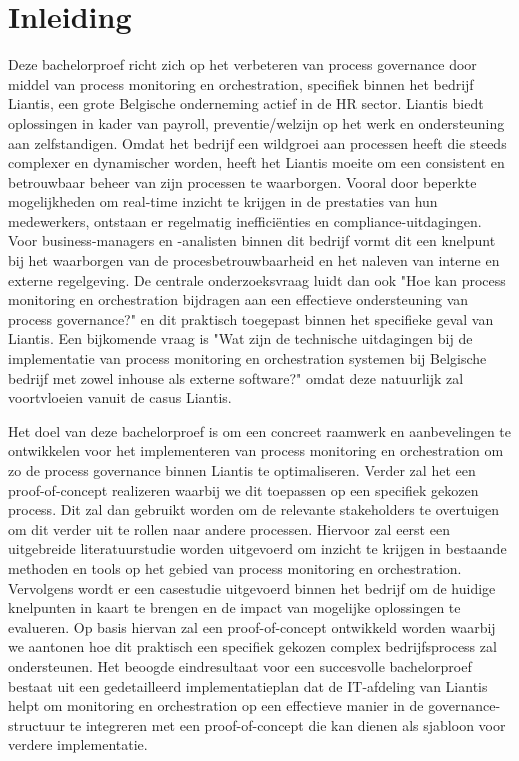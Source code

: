 
\section{Inleiding}%
\label{sec:inleiding}

Deze bachelorproef richt zich op het verbeteren van process governance door middel van process monitoring en orchestration, specifiek binnen het bedrijf Liantis, een grote Belgische onderneming actief in de HR sector. Liantis biedt oplossingen in kader van payroll, preventie/welzijn op het werk en ondersteuning aan zelfstandigen. Omdat het bedrijf een wildgroei aan processen heeft die steeds complexer en dynamischer worden, heeft het Liantis moeite om een consistent en betrouwbaar beheer van zijn processen te waarborgen. Vooral door beperkte mogelijkheden om real-time inzicht te krijgen in de prestaties van hun medewerkers, ontstaan er regelmatig inefficiënties en compliance-uitdagingen. Voor business-managers en -analisten binnen dit bedrijf vormt dit een knelpunt bij het waarborgen van de procesbetrouwbaarheid en het naleven van interne en externe regelgeving. De centrale onderzoeksvraag luidt dan ook "Hoe kan process monitoring en orchestration bijdragen aan een effectieve ondersteuning van process governance?" en dit praktisch toegepast binnen het specifieke geval van Liantis. Een bijkomende vraag is "Wat zijn de technische uitdagingen bij de implementatie van process monitoring en orchestration systemen bij Belgische bedrijf met zowel inhouse als externe software?" omdat deze natuurlijk zal voortvloeien vanuit de casus Liantis.

Het doel van deze bachelorproef is om een concreet raamwerk en aanbevelingen te ontwikkelen voor het implementeren van process monitoring en orchestration om zo de process governance binnen Liantis te optimaliseren. Verder zal het een proof-of-concept realizeren waarbij we dit toepassen op een specifiek gekozen process. Dit zal dan gebruikt worden om de relevante stakeholders te overtuigen om dit verder uit te rollen naar andere processen.  Hiervoor zal eerst een uitgebreide literatuurstudie worden uitgevoerd om inzicht te krijgen in bestaande methoden en tools op het gebied van process monitoring en orchestration. Vervolgens wordt er een casestudie uitgevoerd binnen het bedrijf om de huidige knelpunten in kaart te brengen en de impact van mogelijke oplossingen te evalueren. Op basis hiervan zal een proof-of-concept ontwikkeld worden waarbij we aantonen hoe dit praktisch een specifiek gekozen complex bedrijfsprocess zal ondersteunen. Het beoogde eindresultaat voor een succesvolle bachelorproef bestaat uit een gedetailleerd implementatieplan dat de IT-afdeling van Liantis helpt om monitoring en orchestration op een effectieve manier in de governance-structuur te integreren met een proof-of-concept die kan dienen als sjabloon voor verdere implementatie. 

